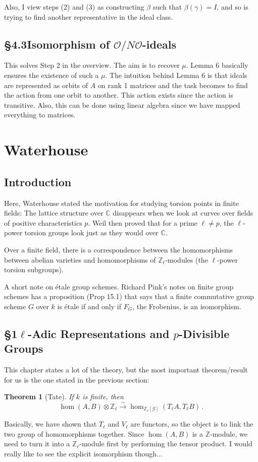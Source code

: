 \documentclass{amsart}
\newtheorem*{theorem*}{Theorem}
\theoremstyle{definition}\newtheorem*{defn}{Definition}
\theoremstyle{definition}\newtheorem*{eg}{Example}
\newcommand{\C}{\mathbb{C}}
\renewcommand{\O}{\mathcal{O}}
\newcommand{\Z}{\mathbb{Z}}
\begin{document}
Also, I view steps (2) and (3) as constructing $\beta$ such that $\beta(\gamma)=I$, and so is trying to find another representative in the ideal class.

\subsection*{\S4.3\hspace{0.5cm}Isomorphism of $\O/N\O$-ideals}
This solves Step 2 in the overview. The aim is to recover $\mu$. Lemma 6 basically ensures the existence of such a $\mu$. The intuition behind Lemma 6 is that ideals are represented as orbits of $A$ on rank 1 matrices and the task becomes to find the action from one orbit to another. This action exists since the action is transitive. Also, this can be done using linear algebra since we have mapped everything to matrices.


\newpage

\section{Waterhouse}
\subsection*{Introduction}
Here, Waterhouse stated the motivation for studying torsion points in finite fields: The lattice structure over $\C$ disappears when we look at curves over fields of positive characteristics $p$. Weil then proved that for a prime $\ell\neq p$, the $\ell$-power torsion groups look just as they would over $\C$.

Over a finite field, there is a correspondence between the homomorphisms between abelian varieties and homomorphisms of $\Z_{\ell}$-modules (the $\ell$-power torsion subgroups).

A short note on \'etale group schemes. Richard Pink's notes on finite group schemes has a proposition (Prop 15.1) that says that a finite commutative group scheme $G$ over $k$ is \'etale if and only if $F_G$, the Frobenius, is an isomorphism.

\subsection*{\S1\hspace{0.5cm}$\ell$-Adic Representations and $p$-Divisible Groups}
This chapter states a lot of the theory, but the most important theorem/result for us is the one stated in the previous section:
\begin{theorem*}[Tate]
If $k$ is finite, then \[\hom(A,B)\otimes\Z_{\ell} \xrightarrow{\sim} \hom_{\Z_{\ell}[\mathcal{G}]}(T_{\ell}A,T_{\ell}B)\,.\]
\end{theorem*}
Basically, we have shown that $T_{\ell}$ and $V_{\ell}$ are functors, so the object is to link the two group of homomorphisms together. Since $\hom(A,B)$ is a $\Z$-module, we need to turn it into a $\Z_{\ell}$-module first by performing the tensor product. I would really like to see the explicit isomorphism though...
\end{document}
